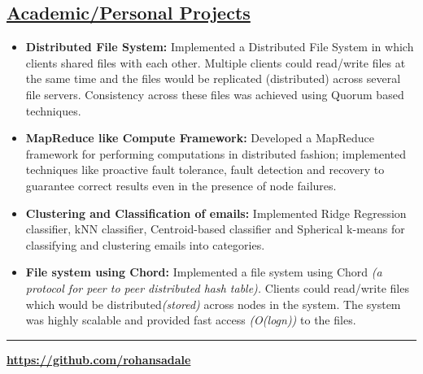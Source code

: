 \documentclass[10pt]{article}
\begin{document}
\begin{itemize}[leftmargin=0.15in]
\begin{itemize}
\end{itemize}
\end{itemize}

\subsection*{\underline{Academic/Personal Projects}}
\vspace{-0.05cm}
\begin{itemize}[leftmargin=0.15in]

\item {\bfseries Distributed File System:} Implemented a Distributed File System in which clients shared files with each other. Multiple clients could read/write files at the same time and the files would be replicated (distributed) across several file servers. Consistency across these files was achieved using Quorum based techniques.

\item {\bfseries MapReduce like Compute Framework:} Developed a MapReduce framework for performing computations in distributed fashion; implemented techniques like proactive fault tolerance, fault detection and recovery to guarantee correct results even in the presence of node failures.

\item {\bfseries Clustering and Classification of emails:} Implemented Ridge Regression classifier, kNN classifier, Centroid-based classifier and Spherical k-means for classifying and clustering emails into categories.

\item {\bfseries File system using Chord:} Implemented a file system using Chord \textit{(a protocol for peer to peer distributed hash table).} Clients could read/write files which would be distributed\textit{(stored)} across nodes in the system. The system was highly scalable and provided fast access \textit{(O(logn))} to the files. 

\end{itemize}
\hrule
\noindent \begin{minipage}[b]{0.3\hsize}
\end{minipage}
\hfill
\begin{minipage}[b]{0.32 \hsize}
{\bfseries {\normalsize \url{https://github.com/rohansadale}}}
\end{minipage}
\end{document}

